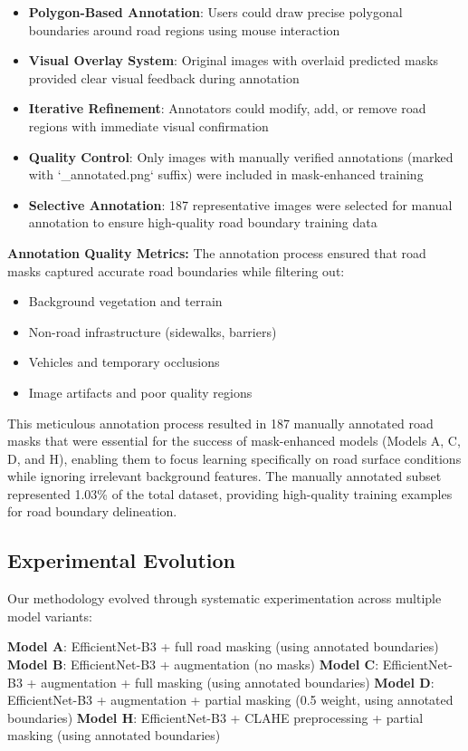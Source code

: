 \documentclass[12pt]{article}
\begin{document}
\begin{itemize}[itemsep=1pt,parsep=0pt,topsep=2pt]
\item \textbf{Polygon-Based Annotation}: Users could draw precise polygonal boundaries around road regions using mouse interaction
\item \textbf{Visual Overlay System}: Original images with overlaid predicted masks provided clear visual feedback during annotation
\item \textbf{Iterative Refinement}: Annotators could modify, add, or remove road regions with immediate visual confirmation
\item \textbf{Quality Control}: Only images with manually verified annotations (marked with `\_annotated.png` suffix) were included in mask-enhanced training
\item \textbf{Selective Annotation}: 187 representative images were selected for manual annotation to ensure high-quality road boundary training data
\end{itemize}

\textbf{Annotation Quality Metrics:}
The annotation process ensured that road masks captured accurate road boundaries while filtering out:
\begin{itemize}[itemsep=1pt,parsep=0pt,topsep=2pt]
\item Background vegetation and terrain
\item Non-road infrastructure (sidewalks, barriers)
\item Vehicles and temporary occlusions
\item Image artifacts and poor quality regions
\end{itemize}

This meticulous annotation process resulted in 187 manually annotated road masks that were essential for the success of mask-enhanced models (Models A, C, D, and H), enabling them to focus learning specifically on road surface conditions while ignoring irrelevant background features. The manually annotated subset represented 1.03\% of the total dataset, providing high-quality training examples for road boundary delineation.

\subsection{Experimental Evolution}

Our methodology evolved through systematic experimentation across multiple model variants:

\textbf{Model A}: EfficientNet-B3 + full road masking (using annotated boundaries)
\textbf{Model B}: EfficientNet-B3 + augmentation (no masks)  
\textbf{Model C}: EfficientNet-B3 + augmentation + full masking (using annotated boundaries)
\textbf{Model D}: EfficientNet-B3 + augmentation + partial masking (0.5 weight, using annotated boundaries)
\textbf{Model H}: EfficientNet-B3 + CLAHE preprocessing + partial masking (using annotated boundaries)
\end{document}
